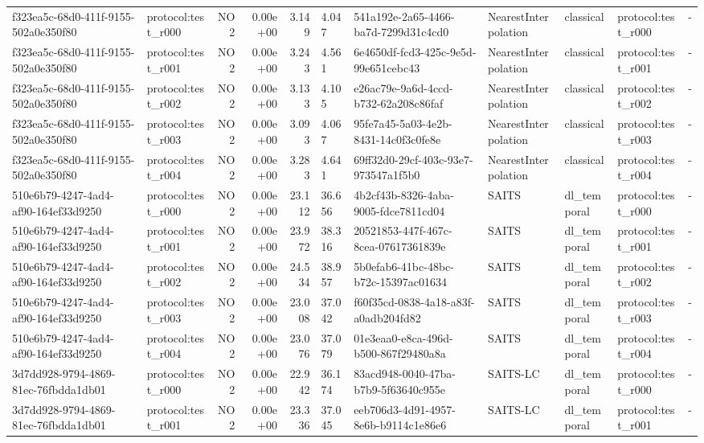 \begin{table}[htbp]
\begin{tabular}{llrrr}
f323ea5c-68d0-411f-9155-502a0e350f80 & protocol:test\_r000 & NO2 & 0.00e+00 & 3.149 & 4.047 & 541a192e-2a65-4466-ba7d-7299d31c4cd0 & NearestInterpolation & classical & protocol:test\_r000 & - \\
f323ea5c-68d0-411f-9155-502a0e350f80 & protocol:test\_r001 & NO2 & 0.00e+00 & 3.243 & 4.561 & 6e4650df-fcd3-425c-9e5d-99e651cebc43 & NearestInterpolation & classical & protocol:test\_r001 & - \\
f323ea5c-68d0-411f-9155-502a0e350f80 & protocol:test\_r002 & NO2 & 0.00e+00 & 3.133 & 4.105 & e26ac79e-9a6d-4ccd-b732-62a208c86faf & NearestInterpolation & classical & protocol:test\_r002 & - \\
f323ea5c-68d0-411f-9155-502a0e350f80 & protocol:test\_r003 & NO2 & 0.00e+00 & 3.093 & 4.067 & 95fe7a45-5a03-4e2b-8431-14c0f3c0fe8e & NearestInterpolation & classical & protocol:test\_r003 & - \\
f323ea5c-68d0-411f-9155-502a0e350f80 & protocol:test\_r004 & NO2 & 0.00e+00 & 3.283 & 4.641 & 69ff32d0-29cf-403c-93e7-973547a1f5b0 & NearestInterpolation & classical & protocol:test\_r004 & - \\
510e6b79-4247-4ad4-af90-164ef33d9250 & protocol:test\_r000 & NO2 & 0.00e+00 & 23.112 & 36.656 & 4b2cf43b-8326-4aba-9005-fdce7811cd04 & SAITS & dl\_temporal & protocol:test\_r000 & - \\
510e6b79-4247-4ad4-af90-164ef33d9250 & protocol:test\_r001 & NO2 & 0.00e+00 & 23.972 & 38.316 & 20521853-447f-467c-8cea-07617361839e & SAITS & dl\_temporal & protocol:test\_r001 & - \\
510e6b79-4247-4ad4-af90-164ef33d9250 & protocol:test\_r002 & NO2 & 0.00e+00 & 24.534 & 38.957 & 5b0efab6-41bc-48bc-b72c-15397ac01634 & SAITS & dl\_temporal & protocol:test\_r002 & - \\
510e6b79-4247-4ad4-af90-164ef33d9250 & protocol:test\_r003 & NO2 & 0.00e+00 & 23.008 & 37.042 & f60f35cd-0838-4a18-a83f-a0adb204fd82 & SAITS & dl\_temporal & protocol:test\_r003 & - \\
510e6b79-4247-4ad4-af90-164ef33d9250 & protocol:test\_r004 & NO2 & 0.00e+00 & 23.076 & 37.079 & 01e3eaa0-e8ca-496d-b500-867f29480a8a & SAITS & dl\_temporal & protocol:test\_r004 & - \\
3d7dd928-9794-4869-81ec-76fbdda1db01 & protocol:test\_r000 & NO2 & 0.00e+00 & 22.942 & 36.174 & 83acd948-0040-47ba-b7b9-5f63640c955e & SAITS-LC & dl\_temporal & protocol:test\_r000 & - \\
3d7dd928-9794-4869-81ec-76fbdda1db01 & protocol:test\_r001 & NO2 & 0.00e+00 & 23.336 & 37.045 & eeb706d3-4d91-4957-8e6b-b9114c1e86e6 & SAITS-LC & dl\_temporal & protocol:test\_r001 & - \\

\end{tabular}
\end{table}
